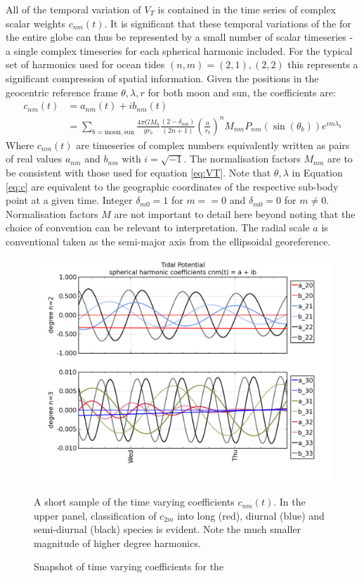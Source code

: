 All of the temporal variation of $V_T$ is contained in the time series of complex scalar weights $c_{nm}(t)$.
It is significant that these temporal variations of the \ATGP{} for the entire globe can thus be represented by a small number of scalar timeseries - a single complex timeseries for each spherical harmonic included.  For the typical set of harmonics used for ocean tides $(n,m)=(2,1),(2,2)$ this represents a significant compression of spatial information.  
Given the positions in the geocentric reference frame $\theta,\lambda,r$ for both moon and sun, the coefficients are:
\begin{align}
\label{eq:c}
c_{nm}(t) &= a_{nm}(t) + ib_{nm}(t) \nonumber \\
          &= \sum_{b=\text{moon},\text{sun}}    \frac{4 \pi GM_{b}}{g r_{b}}  \frac{(2-\delta_{m0})} {(2n+1)} \left(\frac{a}{r_b} \right)^n    M_{nm} P_{nm}( \sin(\theta_b) ) e^{im\lambda_b}
\end{align}
Where $c_{nm}(t)$ are timeseries of complex numbers equivalently written as pairs of real values $a_{nm}$ and $b_{nm}$ with $i=\sqrt{-1}$.  The normalisation factors $M_{nm}$ are to be consistent with those used for equation \ref{eq:VT}.
Note that $\theta,\lambda$ in Equation \ref{eq:c} are equivalent to the geographic coordinates of the respective sub-body point at a given time. 
Integer $\delta_{m0} = 1$ for $m==0$ and $\delta_{m0} = 0$ for $m \neq 0$.\\
Normalisation factors $M$ are not important to detail here beyond noting that the choice of convention can be relevant to interpretation. The radial scale $a$ is conventional taken as the semi-major axis from the ellipsoidal georeference. 
\begin{figure}[!hbt] \centering
    \includegraphics[width=\figwidthBig]{figures/plots/tidal_coeff_timeseries_2days.png}
    \caption{Snapshot of time varying coefficients for the \ATGP{}}
{A short sample of the time varying coefficients $c_{nm}(t)$.  In the upper panel, classification of $c_{2m}$ into long (red), diurnal (blue) and semi-diurnal (black) species is evident.  Note the much smaller magnitude of higher degree harmonics.}
\end{figure}
